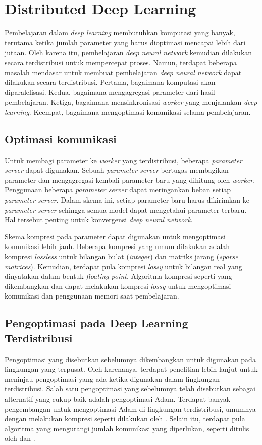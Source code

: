 \section{Distributed Deep Learning}
Pembelajaran dalam \emph{deep learning} membutuhkan komputasi yang banyak, terutama ketika jumlah parameter yang harus dioptimasi mencapai lebih dari jutaan. Oleh karena itu, pembelajaran \emph{deep neural network} kemudian dilakukan secara terdistribusi untuk mempercepat proses. Namun, terdapat beberapa masalah mendasar untuk membuat pembelajaran \emph{deep neural network} dapat dilakukan secara terdistribusi. Pertama, bagaimana komputasi akan diparalelisasi. Kedua, bagaimana mengagregasi parameter dari hasil pembelajaran. Ketiga, bagaimana mensinkronisasi \emph{worker} yang menjalankan \emph{deep learning}. Keempat, bagaimana mengoptimasi komunikasi selama pembelajaran.

\subsection{Optimasi komunikasi}
Untuk membagi parameter ke \emph{worker} yang terdistribusi, beberapa \emph{parameter server} dapat digunakan. Sebuah \emph{parameter server} bertugas membagikan parameter dan mengagregasi kembali parameter baru yang dihitung oleh \emph{worker}. Penggunaan beberapa \emph{parameter server} dapat meringankan beban setiap \emph{parameter server}. Dalam skema ini, setiap parameter baru harus dikirimkan ke \emph{parameter server} sehingga semua model dapat mengetahui parameter terbaru. Hal tersebut penting untuk konvergensi \emph{deep neural network}.

Skema kompresi pada parameter dapat digunakan untuk mengoptimasi komunikasi lebih jauh. Beberapa kompresi yang umum dilakukan adalah kompresi \emph{lossless} untuk bilangan bulat (\emph{integer}) dan matriks jarang (\emph{sparse matrices}). Kemudian, terdapat pula kompresi \emph{lossy} untuk bilangan real yang dinyatakan dalam bentuk \emph{floating point}. Algoritma kompresi seperti yang dikembangkan \textcite{Jin2021Comet} dan \textcite{Horvoth2022Natural} dapat melakukan kompresi \emph{lossy} untuk mengoptimasi komunikasi dan penggunaan memori saat pembelajaran.

\subsection{Pengoptimasi pada Deep Learning Terdistribusi}
Pengoptimasi yang disebutkan sebelumnya dikembangkan untuk digunakan pada lingkungan yang terpusat. Oleh karenanya, terdapat penelitian lebih lanjut untuk meninjau pengoptimasi yang ada ketika digunakan dalam lingkungan terdistribusi. Salah satu pengoptimasi yang sebelumnya telah disebutkan sebagai alternatif yang cukup baik adalah pengoptimasi Adam. Terdapat banyak pengembangan untuk mengoptimasi Adam di lingkungan terdistribusi, umumnya dengan melakukan kompresi seperti dilakukan oleh \textcite{Chen2021CADA}. Selain itu, terdapat pula algoritma yang mengurangi jumlah komunikasi yang diperlukan, seperti ditulis oleh \textcite{Li2022Federated} dan \textcite{Chen2021CADA}.

